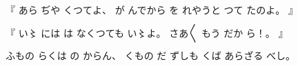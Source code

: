 %
『
あら
ぢや
くつてよ、
%
が
んでから
を
れやうと%
つて
たのよ。
』

%
『
い〻{}%
には
は
なくつても
い〻よ。%
%
さあ〳〵
もう
だか
ら！。
』

%
ふもの
らくは
の
からん、
%
くもの
だ
ずしも
くば
あらざる
べし。
